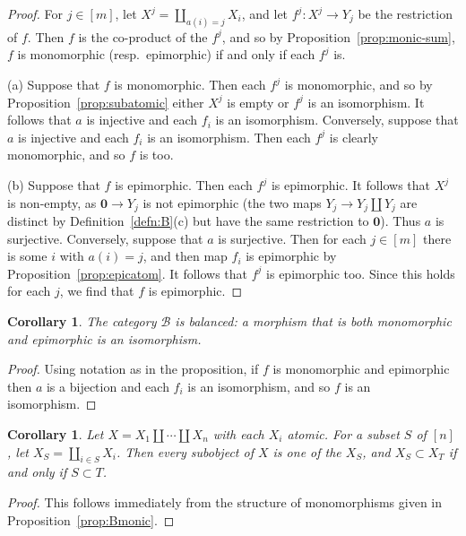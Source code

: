 \documentclass[12pt]{amsart}
\numberwithin{equation}{section}
\newtheorem{corollary}[equation]{Corollary}
\theoremstyle{definition}
\newcommand{\cB}{\mathcal{B}}
\newcommand{\bzero}{\mathbf{0}}
\begin{document}
\begin{proof}
For $j \in [m]$, let $X^j = \coprod_{a(i)=j} X_i$, and let $f^j \colon X^j \to Y_j$ be the restriction of $f$. Then $f$ is the co-product of the $f^j$, and so by Proposition~\ref{prop:monic-sum}, $f$ is monomorphic (resp.\ epimorphic) if and only if each $f^j$ is.

(a) Suppose that $f$ is monomorphic. Then each $f^j$ is monomorphic, and so by Proposition~\ref{prop:subatomic} either $X^j$ is empty or $f^j$ is an isomorphism. It follows that $a$ is injective and each $f_i$ is an isomorphism. Conversely, suppose that $a$ is injective and each $f_i$ is an isomorphism. Then each $f^j$ is clearly monomorphic, and so $f$ is too.

(b) Suppose that $f$ is epimorphic. Then each $f^j$ is epimorphic. It follows that $X^j$ is non-empty, as $\bzero \to Y_j$ is not epimorphic (the two maps $Y_j \to Y_j \amalg Y_j$ are distinct by Definition~\ref{defn:B}(c) but have the same restriction to $\bzero$). Thus $a$ is surjective. Conversely, suppose that $a$ is surjective. Then for each $j \in [m]$ there is some $i$ with $a(i)=j$, and then map $f_i$ is epimorphic by Proposition~\ref{prop:epicatom}. It follows that $f^j$ is epimorphic too. Since this holds for each $j$, we find that $f$ is epimorphic.
\end{proof}

\begin{corollary} \label{cor:balanced}
The category $\cB$ is balanced: a morphism that is both monomorphic and epimorphic is an isomorphism.
\end{corollary}

\begin{proof}
Using notation as in the proposition, if $f$ is monomorphic and epimorphic then $a$ is a bijection and each $f_i$ is an isomorphism, and so $f$ is an isomorphism.
\end{proof}

\begin{corollary} \label{cor:Bsub}
Let $X=X_1 \amalg \cdots \amalg X_n$ with each $X_i$ atomic. For a subset $S$ of $[n]$, let $X_S=\coprod_{i \in S} X_i$. Then every subobject of $X$ is one of the $X_S$, and $X_S \subset X_T$ if and only if $S \subset T$.
\end{corollary}

\begin{proof}
This follows immediately from the structure of monomorphisms given in Proposition~\ref{prop:Bmonic}.
\end{proof}
\end{document}
